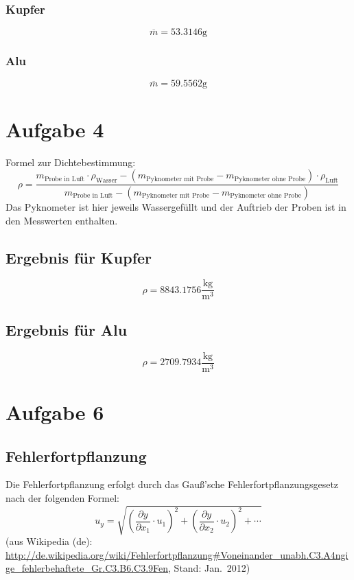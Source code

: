 \documentclass[12pt,a4paper,notitlepage]{article}
\begin{document}
\subsubsection{Kupfer}
\begin{equation}
\overline m=53.3146\mathrm{g}
\end{equation}
\subsubsection{Alu}
\begin{equation}
\overline m=59.5562\mathrm{g}
\end{equation}

\section{Aufgabe 4}
Formel zur Dichtebestimmung:
\begin{equation}
\label{dichteformel}
\rho = \frac{m_\text{Probe in Luft}\cdot\rho_\text{Wasser}-\left(m_\text{Pyknometer mit Probe}-m_\text{Pyknometer ohne Probe}\right)\cdot\rho_\text{Luft}}{m_\text{Probe in Luft}-\left(m_\text{Pyknometer mit Probe}-m_\text{Pyknometer ohne Probe}\right)}
\end{equation}
Das Pyknometer ist hier jeweils Wassergefüllt und der Auftrieb der Proben ist in den Messwerten enthalten.
\subsection{Ergebnis für Kupfer}
\begin{equation}
\rho=8843.1756\frac{\mathrm{kg}}{\mathrm{m}^3}
\end{equation}
\subsection{Ergebnis für Alu}
\begin{equation}
\rho=2709.7934\frac{\mathrm{kg}}{\mathrm{m}^3}
\end{equation}

\section{Aufgabe 6}
\subsection{Fehlerfortpflanzung}
Die Fehlerfortpflanzung erfolgt durch das Gauß'sche Fehlerfortpflanzungsgesetz nach der folgenden Formel:
\begin{equation}
\label{gaussianerrordings}
{u_y}=\sqrt {\left (\frac{\partial y}{\partial x_1} \cdot u_1 \right)^2 +\left (\frac{\partial y}{\partial x_2} \cdot u_2 \right)^2 +\cdots }
\end{equation}
(aus Wikipedia (de): \url{http://de.wikipedia.org/wiki/Fehlerfortpflanzung#Voneinander_unabh.C3.A4ngige_fehlerbehaftete_Gr.C3.B6.C3.9Fen}, Stand: Jan.\ 2012)
\end{document}
